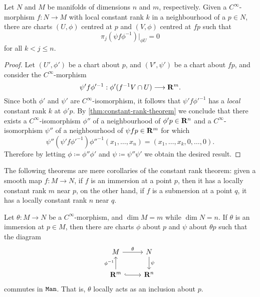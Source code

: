 \begin{theorem}
\label{thm:constant-rank-theorem-manifolds}
Let \(N\) and \(M\) be manifolds of dimensions \(n\) and \(m\),
respectively. Given a \(C^{\infty}\)-morphism \(f: N \to M\) with local constant
rank \(k\) in a neighbourhood of a \(p \in N\), there are charts \((U, \phi)\)
centred at \(p\) and \((V, \phi)\) centred at \(f p\) such that
\[
\pi_j (\psi f \phi^{-1})|_{\phi U} = 0
\]
for all \(k < j \leq n\).
\end{theorem}

\begin{proof}
Let \((U', \phi')\) be a chart about \(p\), and \((V', \psi')\) be a chart about
\(f p\), and consider the \(C^{\infty}\)-morphism
\[
\psi' f \phi'^{-1}: \phi'(f^{-1} V \cap U) \longrightarrow \mathbf{R}^m.
\]
Since both \(\phi'\) and \(\psi'\) are \(C^{\infty}\)-isomorphism, it follows
that \(\psi' f \phi'^{-1}\) has a \emph{local} constant rank \(k\) at
\(\phi' p\). By \cref{thm:constant-rank-theorem} we conclude that there exists a
\(C^{\infty}\)-isomorphism \(\phi''\) of a neighbourhood of \(\phi' p \in \mathbf{R}^n\)
and a \(C^{\infty}\)-isomorphism \(\psi''\) of a neighbourhood of
\(\psi f p \in \mathbf{R}^m\) for which
\[
\psi'' (\psi' f \phi'^{-1}) \phi''^{-1}(x_1, \dots, x_n)
= (x_1, \dots, x_k, 0, \dots, 0).
\]
Therefore by letting \(\phi \coloneq \phi'' \phi'\) and \(\psi \coloneq \psi''
\psi'\) we obtain the desired result.
\end{proof}

The following theorems are mere corollaries of the constant rank theorem: given
a smooth map \(f: M \to N\), if \(f\) is an immersion at a point \(p\), then it
has a locally constant rank \(m\) near \(p\), on the other hand, if \(f\) is a
submersion at a point \(q\), it has a locally constant rank \(n\) near \(q\).

\begin{theorem}[Immersion]
\label{thm:immersion-rank-theorem}
Let \(\theta: M \to N\) be a \(C^{\infty}\)-morphism, and \(\dim M = m\) while
\(\dim N = n\). If \(\theta\) is an immersion at \(p \in M\), then there are
charts \(\phi\) about \(p\) and \(\psi\) about \(\theta p\) such that the
diagram
\[
\begin{tikzcd}
M \ar[r, "\theta"] &N \ar[d, "\psi"] \\
\R^m \ar[u, "\phi^{-1}"] \ar[r, hook] &\R^n
\end{tikzcd}
\]
commutes in \({\texttt{Man}}\). That is, \(\theta\) locally acts as an inclusion about
\(p\).
\end{theorem}

